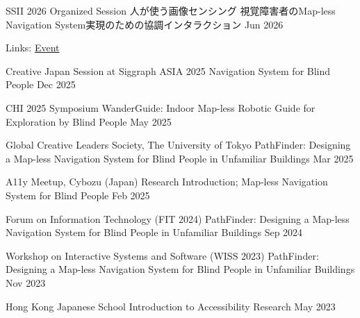 
\begin{cventries}

  \cventry
    {{\jpfont SSII 2026 Organized Session 人が使う画像センシング}}
    {{\jpfont 視覚障害者のMap-less Navigation System実現のための協調インタラクション}}
    {}
    {Jun 2026}
    {
      \begin{cvitems}
        \item {Links: \href{https://pub.confit.atlas.jp/ja/event/ssii2026/content/organized}{Event}}
      \end{cvitems}
    }

  \cventry
    {Creative Japan Session at Siggraph ASIA 2025}
    {Navigation System for Blind People}
    {}
    {Dec 2025}
    {}

  \cventry
    {CHI 2025 Symposium}
    {WanderGuide: Indoor Map-less Robotic Guide for Exploration by Blind People}
    {}
    {May 2025}
    {}

  \cventry
    {Global Creative Leaders Society, The University of Tokyo}
    {PathFinder: Designing a Map-less Navigation System for Blind People in Unfamiliar Buildings}
    {}
    {Mar 2025}
    {}

  \cventry
    {A11y Meetup, Cybozu (Japan)}
    {Research Introduction; Map-less Navigation System for Blind People}
    {}
    {Feb 2025}
    {}

  \cventry
    {Forum on Information Technology (FIT 2024)}
    {PathFinder: Designing a Map-less Navigation System for Blind People in Unfamiliar Buildings}
    {}
    {Sep 2024}
    {}

  \cventry
    {Workshop on Interactive Systems and Software (WISS 2023)}
    {PathFinder: Designing a Map-less Navigation System for Blind People in Unfamiliar Buildings}
    {}
    {Nov 2023}
    {}

  \cventry
    {Hong Kong Japanese School}
    {Introduction to Accessibility Research}
    {}
    {May 2023}
    {}

\end{cventries}
